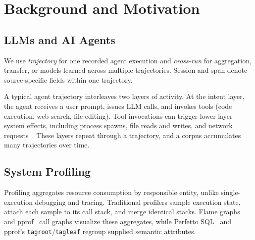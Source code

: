 \documentclass[letterpaper]{article}
\begin{document}
\section{Background and Motivation}
\label{sec:background}

\subsection{LLMs and AI Agents}

We use \emph{trajectory} for one recorded agent execution and
\emph{cross-run} for aggregation, transfer, or models learned across
multiple trajectories. Session and span denote source-specific fields
within one trajectory.

A typical agent trajectory interleaves two layers of activity.
At the intent layer, the agent receives a user prompt, issues LLM
calls, and invokes tools (code execution, web search, file editing).
Tool invocations can trigger lower-layer system effects, including
process spawns, file reads and writes, and network requests~\cite{agentsight}.
These layers repeat through a trajectory, and a corpus accumulates many
trajectories over time.

\subsection{System Profiling}

Profiling aggregates resource consumption by responsible entity,
unlike single-execution debugging and tracing.
Traditional profilers sample execution state, attach each sample to its
call stack, and merge identical stacks.
Flame graphs~\cite{flamegraphs} and pprof~\cite{pprof} call graphs
visualize these aggregates, while Perfetto SQL~\cite{perfetto} and
pprof's \texttt{tagroot}/\texttt{tagleaf} regroup supplied semantic
attributes.
\end{document}
